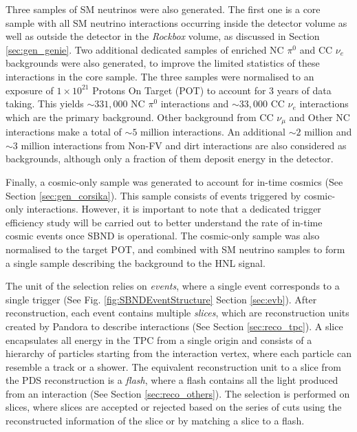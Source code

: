 Three samples of SM neutrinos were also generated.
The first one is a core sample with all SM neutrino interactions occurring inside the detector volume as well as outside the detector in the \textit{Rockbox} volume, as discussed in Section \ref{sec:gen_genie}.
Two additional dedicated samples of enriched NC $\pi^0$ and CC $\nu_e$ backgrounds were also generated, to improve the limited statistics of these interactions in the core sample.
The three samples were normalised to an exposure of $1 \times 10^{21}$ Protons On Target (POT) to account for 3 years of data taking.
This yields $\sim331,000$ NC $\pi^0$ interactions and $\sim33,000$ CC $\nu_e$ interactions which are the primary background.
Other background from CC $\nu_\mu$ and Other NC interactions make a total of $\sim5$ million interactions.
An additional $\sim2$ million and $\sim3$ million interactions from Non-FV and dirt interactions are also considered as backgrounds, although only a fraction of them deposit energy in the detector.

Finally, a cosmic-only sample was generated to account for in-time cosmics (See Section \ref{sec:gen_corsika}).
This sample consists of events triggered by cosmic-only interactions.
However, it is important to note that a dedicated trigger efficiency study will be carried out to better understand the rate of in-time cosmic events once SBND is operational.
The cosmic-only sample was also normalised to the target POT, and combined with SM neutrino samples to form a single sample describing the background to the HNL signal.  

The unit of the selection relies on \textit{events}, where a single event corresponds to a single trigger (See Fig. \ref{fig:SBNDEventStructure} Section \ref{sec:evb}).
After reconstruction, each event contains multiple \textit{slices}, which are reconstruction units created by Pandora to describe interactions (See Section \ref{sec:reco_tpc}).
A slice encapsulates all energy in the TPC from a single origin and consists of a hierarchy of particles starting from the interaction vertex, where each particle can resemble a track or a shower.
The equivalent reconstruction unit to a slice from the PDS reconstruction is a \textit{flash}, where a flash contains all the light produced from an interaction (See Section \ref{sec:reco_others}).
The selection is performed on slices, where slices are accepted or rejected based on the series of cuts using the reconstructed information of the slice or by matching a slice to a flash.



